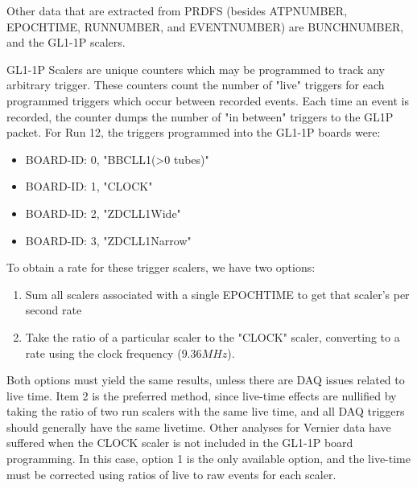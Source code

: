 Other data that are extracted from PRDFS (besides ATPNUMBER, EPOCHTIME,
RUNNUMBER, and EVENTNUMBER) are BUNCHNUMBER, and the GL1-1P scalers.

GL1-1P Scalers are unique counters which may be programmed to track any
arbitrary trigger. These counters count the number of "live" triggers for each
programmed triggers which occur between recorded events. Each time an event is
recorded, the counter dumps the number of "in between" triggers to the GL1P
packet. For Run 12, the triggers programmed into the GL1-1P boards were:

\begin{itemize}
\item BOARD-ID: 0, "BBCLL1(\textgreater0 tubes)"
\item BOARD-ID: 1, "CLOCK"
\item BOARD-ID: 2, "ZDCLL1Wide"
\item BOARD-ID: 3, "ZDCLL1Narrow"
\end{itemize}

To obtain a rate for these trigger scalers, we have two options:
\begin{enumerate}
\item Sum all scalers associated with a single EPOCHTIME to get that scaler's
  per second rate
\item Take the ratio of a particular scaler to the "CLOCK" scaler, converting
  to a rate using the clock frequency ($9.36MHz$).
\end{enumerate}

Both options must yield the same results, unless there are DAQ issues related
to live time. Item 2 is the preferred method, since live-time effects are
nullified by taking the ratio of two run scalers with the same live time, and
all DAQ triggers should generally have the same livetime. Other analyses for
Vernier data have suffered when the CLOCK scaler is not included in the GL1-1P
board programming. In this case, option 1 is the only available option, and the
live-time must be corrected using ratios of live to raw events for each scaler.

